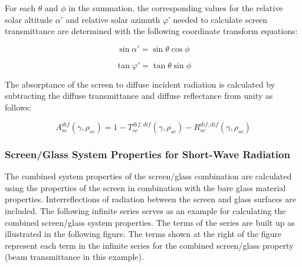 For each \(\theta\) and \(\phi\) in the summation, the corresponding values for the relative solar altitude \(\alpha\)' and relative solar azimuth \(\varphi\)' needed to calculate screen transmittance are determined with the following coordinate transform equations:

\begin{equation}
\sin \alpha ' = \sin \theta \cos \phi
\end{equation}

\begin{equation}
\tan \varphi ' = \tan \theta \sin \phi
\end{equation}

The absorptance of the screen to diffuse incident radiation is calculated by subtracting the diffuse transmittance and diffuse reflectance from unity as follows:

\begin{equation}
A_{sc}^{dif}(\gamma ,{\rho_{sc}}) = 1 - T_{sc}^{dif,dif}(\gamma ,{\rho_{sc}}) - R_{sc}^{dif,dif}(\gamma ,{\rho_{sc}})
\end{equation}

\subsubsection{Screen/Glass System Properties for Short-Wave Radiation}\label{screenglass-system-properties-for-short-wave-radiation}

The combined system properties of the screen/glass combination are calculated using the properties of the screen in combination with the bare glass material properties. Interreflections of radiation between the screen and glass surfaces are included. The following infinite series serves as an example for calculating the combined screen/glass system properties. The terms of the series are built up as illustrated in the following figure. The terms shown at the right of the figure represent each term in the infinite series for the combined screen/glass property (beam transmittance in this example).

